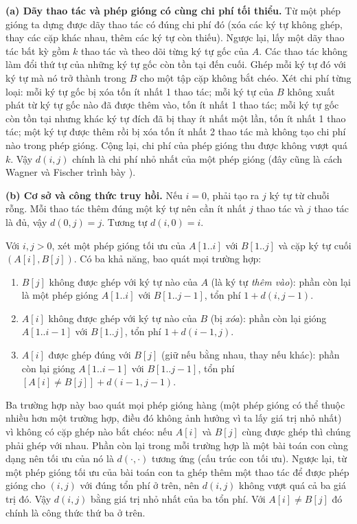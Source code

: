 \documentclass[12pt,a4paper]{article}
\begin{document}
\textbf{(a) Dãy thao tác và phép gióng có cùng chi phí tối thiểu.} Từ một phép gióng ta dựng được dãy thao tác có đúng chi phí đó (xóa các ký tự không ghép, thay các cặp khác nhau, thêm các ký tự còn thiếu). Ngược lại, lấy một dãy thao tác bất kỳ gồm $k$ thao tác và theo dõi từng ký tự gốc của $A$. Các thao tác không làm đổi thứ tự của những ký tự gốc còn tồn tại đến cuối. Ghép mỗi ký tự đó với ký tự mà nó trở thành trong $B$ cho một tập cặp không bắt chéo. Xét chi phí từng loại: mỗi ký tự gốc bị xóa tốn ít nhất 1 thao tác; mỗi ký tự của $B$ không xuất phát từ ký tự gốc nào đã được thêm vào, tốn ít nhất 1 thao tác; mỗi ký tự gốc còn tồn tại nhưng khác ký tự đích đã bị thay ít nhất một lần, tốn ít nhất 1 thao tác; một ký tự được thêm rồi bị xóa tốn ít nhất 2 thao tác mà không tạo chi phí nào trong phép gióng. Cộng lại, chi phí của phép gióng thu được không vượt quá $k$. Vậy $d(i,j)$ chính là chi phí nhỏ nhất của một phép gióng (đây cũng là cách Wagner và Fischer trình bày \cite{wagner}).

\textbf{(b) Cơ sở và công thức truy hồi.} Nếu $i=0$, phải tạo ra $j$ ký tự từ chuỗi rỗng. Mỗi thao tác thêm đúng một ký tự nên cần ít nhất $j$ thao tác và $j$ thao tác là đủ, vậy $d(0,j)=j$. Tương tự $d(i,0)=i$.

Với $i,j>0$, xét một phép gióng tối ưu của $A[1..i]$ với $B[1..j]$ và cặp ký tự cuối $(A[i],B[j])$. Có ba khả năng, bao quát mọi trường hợp:
\begin{enumerate}[nosep]
  \item $B[j]$ không được ghép với ký tự nào của $A$ (là ký tự \emph{thêm vào}): phần còn lại là một phép gióng $A[1..i]$ với $B[1..j-1]$, tổn phí $1+d(i,j-1)$.
  \item $A[i]$ không được ghép với ký tự nào của $B$ (bị \emph{xóa}): phần còn lại gióng $A[1..i-1]$ với $B[1..j]$, tổn phí $1+d(i-1,j)$.
  \item $A[i]$ được ghép đúng với $B[j]$ (giữ nếu bằng nhau, thay nếu khác): phần còn lại gióng $A[1..i-1]$ với $B[1..j-1]$, tổn phí $[A[i]\ne B[j]]+d(i-1,j-1)$.
\end{enumerate}
Ba trường hợp này bao quát mọi phép gióng hàng (một phép gióng có thể thuộc nhiều hơn một trường hợp, điều đó không ảnh hưởng vì ta lấy giá trị nhỏ nhất) vì không có cặp ghép nào bắt chéo: nếu $A[i]$ và $B[j]$ cùng được ghép thì chúng phải ghép với nhau. Phần còn lại trong mỗi trường hợp là một bài toán con cùng dạng nên tối ưu của nó là $d(\cdot,\cdot)$ tương ứng (cấu trúc con tối ưu). Ngược lại, từ một phép gióng tối ưu của bài toán con ta ghép thêm một thao tác để được phép gióng cho $(i,j)$ với đúng tổn phí ở trên, nên $d(i,j)$ không vượt quá cả ba giá trị đó. Vậy $d(i,j)$ bằng giá trị nhỏ nhất của ba tổn phí. Với $A[i]\ne B[j]$ đó chính là công thức thứ ba ở trên.
\end{document}
